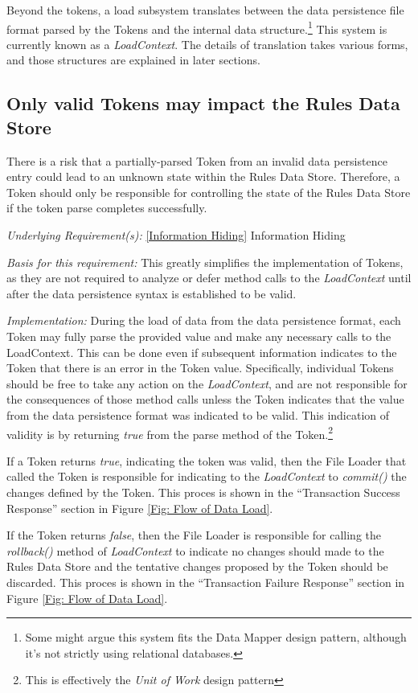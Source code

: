 \documentclass[12pt,letterpaper]{article}
\newcommand{\textem}[1]{\emph{#1}}
\newcommand{\lsubsection}[1]{\label{#1}\subsection{#1}}
\newcommand{\myref}[1]{\ref{#1} #1}
\newcommand{\basis}{\noindent\textem{Basis for this requirement:} }
\newcommand{\impl}{\noindent\textem{Implementation:} }
\newcommand{\under}{\noindent\textem{Underlying Requirement(s):} }
\begin{document}
Beyond the tokens, a load subsystem translates between the data persistence file format parsed by 
the Tokens and the internal data structure.\footnote{Some might argue this
system fits the Data Mapper design pattern, although it's not strictly using relational databases.}
This system is currently known as a \textem{LoadContext}.  The details of translation takes
various forms, and those structures are explained in later sections.

\lsubsection{Only valid Tokens may impact the Rules Data Store}

There is a risk that a partially-parsed Token from an invalid data persistence entry could
lead to an unknown state within the Rules Data Store.  Therefore, a Token should only be
responsible for controlling the state of the Rules Data Store if the token parse
completes successfully.

\under \myref{Information Hiding}

\basis This greatly simplifies the implementation of Tokens, as they are not required to
analyze or defer method calls to the \textem{LoadContext} until after the data persistence syntax
is established to be valid.

\impl During the load of data from the data persistence format, each Token may fully parse
the provided value and make any necessary calls to the LoadContext.  This can be done even if
subsequent information indicates to the Token that there is an error in the Token value.  
Specifically, individual Tokens should be free to take any action on the \textem{LoadContext}, 
and are not responsible for the consequences of those method calls unless the Token indicates
that the value from the data persistence format was indicated to be valid.  This indication of 
validity is by returning \textem{true} from the parse method of the Token.\footnote{This is 
effectively the \textem{Unit of Work} design pattern}

If a Token returns \textem{true}, indicating the token was valid, then the File Loader that
called the Token is responsible for indicating to the \textem{LoadContext} to \textem{commit()}
the changes defined by the Token.  This proces is shown in the ``Transaction Success Response''
section in Figure \ref{Fig: Flow of Data Load}.

If the Token returns \textem{false}, then the File Loader is
responsible for calling the \textem{rollback()} method of \textem{LoadContext} to indicate
no changes should made to the Rules Data Store and the tentative changes proposed by the Token
should be discarded.  This proces is shown in the ``Transaction Failure Response'' section
in Figure \ref{Fig: Flow of Data Load}.
\end{document}
